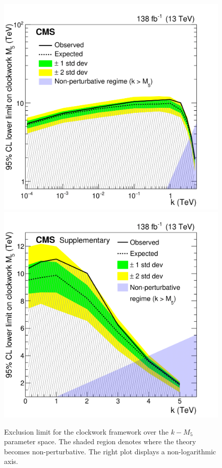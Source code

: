 \begin{figure}[h!]
     \caption{Exclusion limit for the clockwork framework over the $k-M_5$ parameter space. The shaded region denotes where the theory becomes non-perturbative. The right plot displays a non-logarithmic axis.}
    \centering
       \includegraphics[width=0.48\linewidth]{fig/Figure_007-1.png}
    \includegraphics[width=0.48\linewidth]{fig/Figure-aux_003-1.png}
    \label{Fig:LIMIT_Clockwork_real}
\end{figure}


